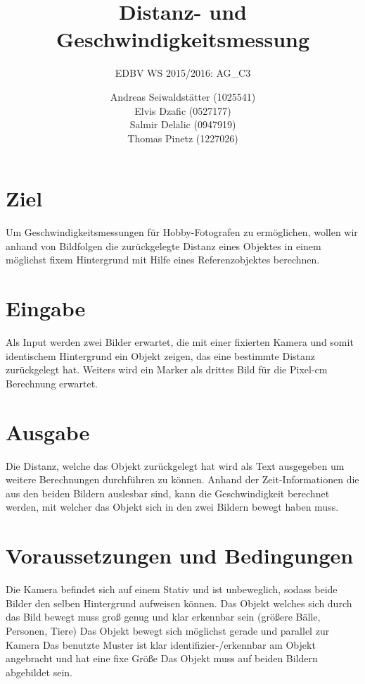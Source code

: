 \documentclass[deutsch]{scrartcl}
\begin{document}
\title{Distanz- und Geschwindigkeitsmessung} 
\subtitle{EDBV WS 2015/2016: AG\_C3}

\author{Andreas Seiwaldstätter (1025541)\\
Elvis Dzafic (0527177)\\
Salmir Delalic (0947919)\\
Thomas Pinetz (1227026)}



\maketitle


\section{Ziel}
Um Geschwindigkeitsmessungen für Hobby-Fotografen zu ermöglichen, wollen wir anhand von Bildfolgen die zurückgelegte Distanz eines Objektes in einem möglichst fixem Hintergrund mit Hilfe eines Referenzobjektes berechnen.

\section{Eingabe}
Als Input werden zwei Bilder erwartet, die mit einer fixierten Kamera und somit identischem Hintergrund ein Objekt zeigen, das eine bestimmte Distanz zurückgelegt hat.
Weiters wird ein Marker als drittes Bild für die Pixel-cm Berechnung erwartet.

\section{Ausgabe}
Die Distanz, welche das Objekt zurückgelegt hat wird als Text ausgegeben um weitere Berechnungen durchführen zu können. Anhand der Zeit-Informationen die aus den beiden Bildern auslesbar sind, kann die Geschwindigkeit berechnet werden, mit welcher das Objekt sich in den zwei Bildern bewegt haben muss.

\section{Voraussetzungen und Bedingungen}
Die Kamera befindet sich auf einem Stativ und ist unbeweglich, sodass beide Bilder den selben Hintergrund aufweisen können.
Das Objekt welches sich durch das Bild bewegt muss groß genug und klar erkennbar sein (größere Bälle, Personen, Tiere)
Das Objekt bewegt sich möglichst gerade und parallel zur Kamera
Das benutzte Muster ist klar identifizier-/erkennbar am Objekt angebracht und hat eine fixe Größe
Das Objekt muss auf beiden Bildern abgebildet sein.
\end{document}
